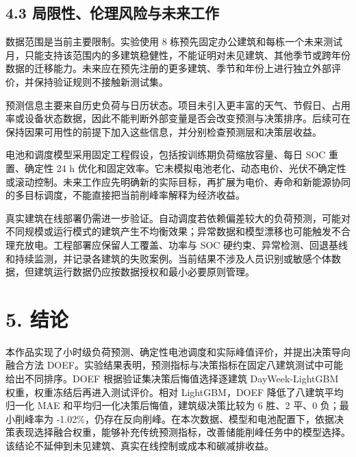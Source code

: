 \documentclass[12pt,a4paper]{article}
\begin{document}
\subsection{4.3 局限性、伦理风险与未来工作}
数据范围是当前主要限制。实验使用 8 栋预先固定办公建筑和每栋一个未来测试月，只能支持该范围内的多建筑稳健性，不能证明对未见建筑、其他季节或跨年份数据的迁移能力。未来应在预先注册的更多建筑、季节和年份上进行独立外部评价，并保持验证规则不接触新测试集。\par
预测信息主要来自历史负荷与日历状态。项目未引入更丰富的天气、节假日、占用率或设备状态数据，因此不能判断外部变量是否会改变预测与决策排序。后续可在保持因果可用性的前提下加入这些信息，并分别检查预测层和决策层收益。\par
电池和调度模型采用固定工程假设，包括按训练期负荷缩放容量、每日 SOC 重置、确定性 24 h 优化和固定效率。它未模拟电池老化、动态电价、光伏不确定性或滚动控制。未来工作应先明确新的实际目标，再扩展为电价、寿命和新能源协同的多目标调度，不能直接把当前削峰率解释为经济收益。\par
真实建筑在线部署仍需进一步验证。自动调度若依赖偏差较大的负荷预测，可能对不同规模或运行模式的建筑产生不均衡效果；异常数据和模型漂移也可能触发不合理充放电。工程部署应保留人工覆盖、功率与 SOC 硬约束、异常检测、回退基线和持续监测，并记录各建筑的失败案例。当前结果不涉及人员识别或敏感个体数据，但建筑运行数据仍应按数据授权和最小必要原则管理。\par
\section{5. 结论}
本作品实现了小时级负荷预测、确定性电池调度和实际峰值评价，并提出决策导向融合方法 DOEF。实验结果表明，预测指标与决策指标在固定八建筑测试中可能给出不同排序。DOEF 根据验证集决策后悔值选择逐建筑 DayWeek-LightGBM 权重，权重冻结后再进入测试评价。相对 LightGBM，DOEF 降低了八建筑平均归一化 MAE 和平均归一化决策后悔值，建筑级决策比较为 6 胜、2 平、0 负；最小削峰率为 -1.02\%，仍存在反向削峰。在本次数据、模型和电池配置下，依据决策表现选择融合权重，能够补充传统预测指标，改善储能削峰任务中的模型选择。该结论不延伸到未见建筑、真实在线控制或成本和碳减排收益。\par
\fontsize{10.5}{20}\selectfont
\end{document}
